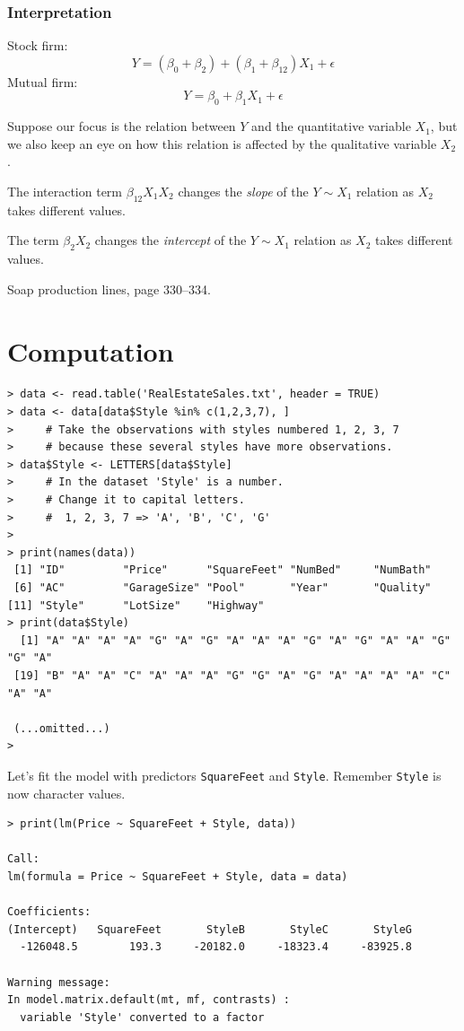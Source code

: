 \documentclass[12pt]{article}
\begin{document}
\subsubsection{Interpretation}

Stock firm:
\[
Y = (\beta_0 + \beta_2) + (\beta_1 + \beta_{12}) X_1  + \epsilon
\]
Mutual firm:
\[
Y = \beta_0 + \beta_1 X_1  + \epsilon
\]

Suppose our focus is the relation between $Y$ and the quantitative
variable $X_1$,
but we also keep an eye on
how this relation is affected by the qualitative variable $X_2$.

The interaction term $\beta_{12} X_1 X_2$
changes the \emph{slope} of the $Y \sim X_1$ relation as $X_2$ takes
different values.

The term $\beta_2 X_2$
changes the \emph{intercept} of the $Y \sim X_1$ relation as $X_2$ takes
different values.

\example
Soap production lines, page 330--334.

\section{Computation}
\begin{verbatim}
> data <- read.table('RealEstateSales.txt', header = TRUE)
> data <- data[data$Style %in% c(1,2,3,7), ]
>     # Take the observations with styles numbered 1, 2, 3, 7
>     # because these several styles have more observations.
> data$Style <- LETTERS[data$Style]
>     # In the dataset 'Style' is a number.
>     # Change it to capital letters.
>     #  1, 2, 3, 7 => 'A', 'B', 'C', 'G'
> 
> print(names(data))
 [1] "ID"         "Price"      "SquareFeet" "NumBed"     "NumBath"   
 [6] "AC"         "GarageSize" "Pool"       "Year"       "Quality"   
[11] "Style"      "LotSize"    "Highway"   
> print(data$Style)
  [1] "A" "A" "A" "A" "G" "A" "G" "A" "A" "A" "G" "A" "G" "A" "A" "G" "G" "A"
 [19] "B" "A" "A" "C" "A" "A" "A" "G" "G" "A" "G" "A" "A" "A" "A" "C" "A" "A"

 (...omitted...)
> 
\end{verbatim}

Let's fit the model with predictors
\verb+SquareFeet+ and \verb+Style+.
Remember \verb+Style+ is now character values.
\begin{verbatim}
> print(lm(Price ~ SquareFeet + Style, data))

Call:
lm(formula = Price ~ SquareFeet + Style, data = data)

Coefficients:
(Intercept)   SquareFeet       StyleB       StyleC       StyleG  
  -126048.5        193.3     -20182.0     -18323.4     -83925.8  

Warning message:
In model.matrix.default(mt, mf, contrasts) :
  variable 'Style' converted to a factor
\end{verbatim}
\end{document}
